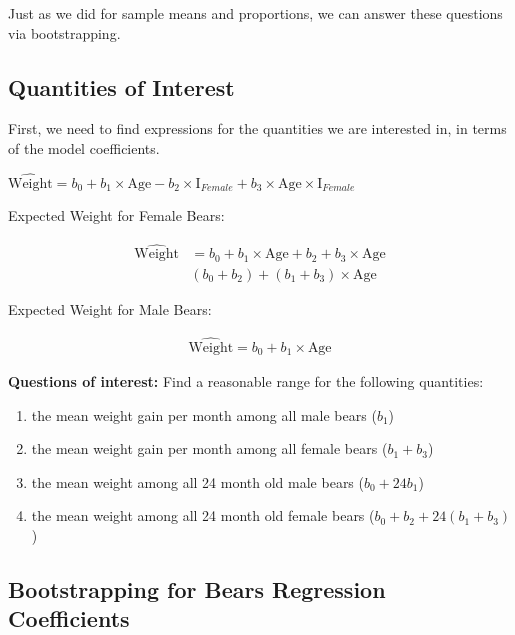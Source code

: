 \documentclass[]{book}
\providecommand{\tightlist}{%
  \setlength{\itemsep}{0pt}\setlength{\parskip}{0pt}}
\begin{document}
Just as we did for sample means and proportions, we can answer these
questions via bootstrapping.

\subsection{Quantities of Interest}\label{quantities-of-interest}

First, we need to find expressions for the quantities we are interested
in, in terms of the model coefficients.

\(\widehat{\text{Weight}}= b_0+ b_1 \times\text{Age} - b_2\times\text{I}_{Female} + b_3\times\text{Age}\times\text{I}_{Female}\)

Expected Weight for Female Bears:

\[
\begin{aligned}
\widehat{\text{Weight}} & = b_0+ b_1 \times\text{Age}+ b_2 + b_3\times\text{Age} \\
 & (b_0 + b_2) + (b_1+b_3)\times\text{Age} 
\end{aligned}
\]

Expected Weight for Male Bears:

\[
\begin{aligned}
\widehat{\text{Weight}}= b_0 + b_1 \times\text{Age}
\end{aligned}
\]

\textbf{Questions of interest:} Find a reasonable range for the
following quantities:

\begin{enumerate}
\def\labelenumi{\arabic{enumi}.}
\tightlist
\item
  the mean weight gain per month among all male bears (\(b_1\))\\
\item
  the mean weight gain per month among all female bears
  (\(b_1 + b_3\))\\
\item
  the mean weight among all 24 month old male bears (\(b_0 + 24b_1\))\\
\item
  the mean weight among all 24 month old female bears
  (\(b_0 + b_2 + 24(b_1+b_3)\))
\end{enumerate}

\subsection{Bootstrapping for Bears Regression
Coefficients}\label{bootstrapping-for-bears-regression-coefficients}
\end{document}
